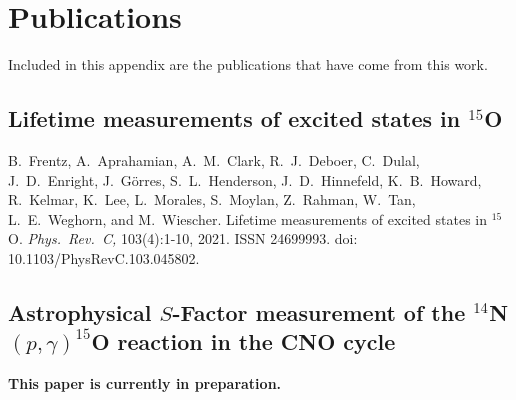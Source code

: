 %
%
%
%
%
%
%
%

%
%

\chapter{Publications}
\label{appendix: pubs}

Included in this appendix are the publications that have come from this work.



\section{Lifetime measurements of excited states in $^{15}$O}

\cite{Frentz2021} B.\ Frentz, A.\ Aprahamian, A.\ M.\ Clark, R.\ J.\ Deboer, C.\ Dulal, J.\ D.\ Enright, J.\ G{\"{o}}rres, S.\ L.\ Henderson, J.\ D.\ Hinnefeld, K.\ B.\ Howard, R.\ Kelmar, K.\ Lee, L.\ Morales, S.\ Moylan, Z.\ Rahman, W.\ Tan, L.\ E.\ Weghorn, and M.\ Wiescher. Lifetime measurements of excited states in $^{15}$O. \textit{Phys.\ Rev.\ C,} 103(4):1-10, 2021. ISSN 24699993. doi: 10.1103/PhysRevC.103.045802.




\section{Astrophysical $S$-Factor measurement of the $^{14}$N$(p,\gamma)^{15}$O reaction in the CNO cycle}

\textbf{This paper is currently in preparation.}



%
% 
% 
